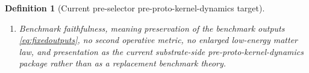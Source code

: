 \documentclass[11pt]{article}
\newcommand{\YoctoSelectorBody}[1]{\mathcal B_{#1}^{\mathrm{yoc,sel}}}
\newcommand{\YoctoSelectorShell}[1]{\mathcal Z_{#1}^{\mathrm{yoc,sel}}}
\newcommand{\PreSectionSelectorProj}[1]{\Pi_{#1}^{\mathrm{presel,sel}}}
\newcommand{\KernelProj}[1]{\Lambda_{#1}^{\mathrm{presel,ker}}}
\newcommand{\PreKernelProj}[1]{\Upsilon_{#1}^{\mathrm{presel,preker}}}
\newcommand{\ProtoKernelProj}[1]{\Omega_{#1}^{\mathrm{presel,proker}}}
\newcommand{\PreProtoKernelBody}[1]{\mathcal D_{#1}^{\mathrm{presel,preproker}}}
\newcommand{\PreProtoKernelProj}[1]{\Xi_{#1}^{\mathrm{presel,preproker}}}
\newcommand{\PreProtoKernelFunctional}[1]{\mathscr V_{#1}^{\mathrm{presel,preproker}}}
\newcommand{\PreProtoKernelFullFiber}[2]{\mathcal Q_{#1}^{\mathrm{presel,preproker,full}}(#2)}
\newcommand{\PreProtoKernelFullMin}[1]{\mathfrak d_{#1}^{\mathrm{presel,preproker}}}
\newcommand{\PreProtoKernelShell}[1]{\mathcal O_{#1}^{\mathrm{presel,preproker}}}
\newcommand{\InducedProtoKernelShell}[1]{\widetilde{\mathcal E}_{#1}^{\mathrm{presel,proker}}}
\newtheorem{definition}{Definition}
\begin{document}
\begin{definition}[Current pre-selector pre-proto-kernel-dynamics target]
\begin{enumerate}
\[    \right\}.
    \]
    The restriction of \(\PreProtoKernelFunctional{\sigma}\) to \(\PreProtoKernelFullFiber{\sigma}{y}\) is required to attain a unique minimizer depending smoothly on \(y\); write
    \[
    \PreProtoKernelFullMin{\sigma}:\YoctoSelectorBody{\sigma}\to\PreProtoKernelBody{\sigma}.
    \]
    The exact pre-proto-kernel shell
    \[
    \PreProtoKernelShell{\sigma}
    \equiv
    \left\{
    r\in\PreProtoKernelBody{\sigma}:
    \PreSectionSelectorProj{\sigma}\bigl(\KernelProj{\sigma}(\PreKernelProj{\sigma}(\ProtoKernelProj{\sigma}(\PreProtoKernelProj{\sigma}(r))))\bigr)\in\YoctoSelectorShell{\sigma},
    \;
    \PreProtoKernelFunctional{\sigma}(r)
    =
    \min_{s\in\PreProtoKernelFullFiber{\sigma}{\PreSectionSelectorProj{\sigma}(\KernelProj{\sigma}(\PreKernelProj{\sigma}(\ProtoKernelProj{\sigma}(\PreProtoKernelProj{\sigma}(r)))))}}
    \PreProtoKernelFunctional{\sigma}(s)
    \right\}
    \]
    is required to be a closed embedded submanifold, and
    \[
    \PreProtoKernelProj{\sigma}\big|_{\PreProtoKernelShell{\sigma}}
    :
    \PreProtoKernelShell{\sigma}\xrightarrow{\cong}\InducedProtoKernelShell{\sigma}
    \]
    is required to be a diffeomorphism.
    \item Benchmark faithfulness, meaning preservation of the benchmark outputs \eqref{eq:fixedoutputs}, no second operative metric, no enlarged low-energy matter law, and presentation as the current substrate-side pre-proto-kernel-dynamics package rather than as a replacement benchmark theory.
\end{enumerate}
\end{definition}
\end{document}
